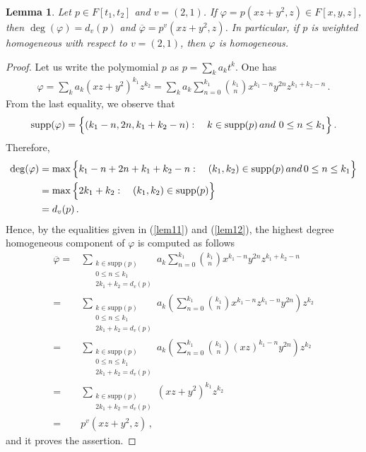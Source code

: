 \documentclass{amsart}
\newtheorem{lem}{Lemma}
\def\supp {\mathrm{supp}}
\begin{document}
\begin{lem}\label{lemwild} 
	Let $p\in F[t_1,t_2]$ and $v=(2,1)$. If $\varphi=p(xz+y^2,z)\in F[x,y,z]$, then $\deg(\varphi)=d_v(p)$ and $\overline{\varphi}=p^v(xz+y^2,z)$. In particular, if $p$ is weighted homogeneous with respect to $v=(2,1)$, then $\varphi$ is homogeneous.
\end{lem}
\begin{proof}
	Let us write the polymomial $p$ as $p=\sum_k a_{k} t^{k}$. One has
	\begin{align*} 
		\varphi=\sum_k a_{k} (xz+y^2)^{k_1}z^{k_2}=\sum_k a_{k}\sum_{n=0}^{k_1}\binom{k_1}{n}x^{k_1-n}y^{2n}z^{k_1+k_2-n}\,.
	\end{align*}
	From the last equality, we observe that \begin{equation}\label{lem11}
		\supp(\varphi)=\Big\{(k_1-n,2n,k_1+k_2-n): \quad k\in \supp(p)\,\textnormal{and}\,\, 0\leq n\leq k_1\Big\}\,.
	\end{equation}
	Therefore,
	\begin{align} 
		\deg(\varphi)&=\max\Big\{k_1-n+2n+k_1+k_2-n:\quad (k_1,k_2)\in \supp(p)\,\textnormal{and}\, 0\leq n\leq k_1 \Big\}\nonumber\\
		&=\max\Big\{2k_1+k_2:\quad (k_1,k_2)\in \supp(p)\Big\}\nonumber\\
		&=d_v(p)\label{lem12}\,.
	\end{align}
	Hence, by the equalities  given in  (\ref{lem11}) and (\ref{lem12}), the highest degree homogeneous component of $\varphi$ is computed as follows
	\begin{align*} 
		\overline{\varphi}=&\sum_{\substack{k\in \supp(p)\\0\leq n\leq k_1\\2k_1+k_2=d_v(p)}}a_{k}\sum_{n=0}^{k_1}\binom{k_1}{n}x^{k_1-n}y^{2n}z^{k_1+k_2-n}\\
		=&\sum_{\substack{k\in \supp(p)\\0\leq n\leq k_1\\2k_1+k_2=d_v(p)}}a_{k}\left(\sum_{n=0}^{k_1}\binom{k_1}{n}x^{k_1-n}z^{k_1-n}y^{2n}\right)z^{k_2}\\
		=&\sum_{\substack{k\in \supp(p)\\0\leq n\leq k_1\\2k_1+k_2=d_v(p)}}a_{k}\left(\sum_{n=0}^{k_1}\binom{k_1}{n}(xz)^{k_1-n}y^{2n}\right)z^{k_2}\\
		=&\sum_{\substack{k\in \supp(p)\\2k_1+k_2=d_v(p)}}\left(xz+y^2\right)^{k_1}z^{k_2}\\
		=& p^{v}(xz+y^2,z)\,,
	\end{align*}
	and it proves the assertion. 
\end{proof}
\end{document}
